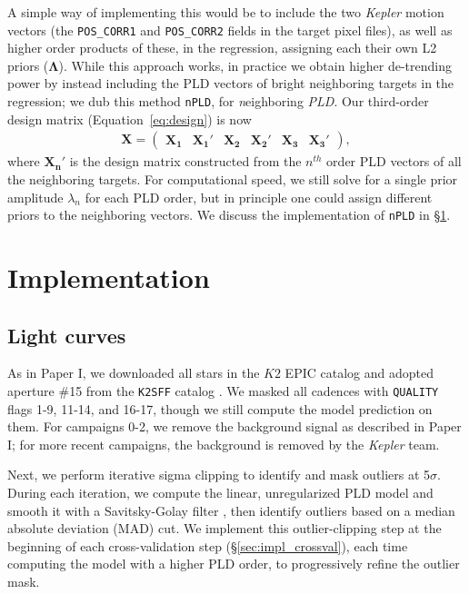 \documentclass[]{emulateapj}
\begin{document}
A simple way of implementing this would be to include the two \emph{Kepler} motion vectors (the
\texttt{POS\_CORR1} and \texttt{POS\_CORR2} fields in the target pixel files), as well as
higher order products of these, in the regression, assigning each their own L2 priors ($\mathbf{\Lambda}$).
While this approach works, in practice we obtain higher de-trending power by instead including the PLD
vectors of bright neighboring targets in the regression; we dub this method \texttt{nPLD}, for \emph{n}eighboring
\emph{PLD}. Our third-order design matrix (Equation~\ref{eq:design}) is now
%
\begin{align}
\label{eq:design_nPLD}
\mathbf{X} = 
\left(
\begin{array}{cccccc}
  \mathbf{X_1} & \mathbf{X_1'} & \mathbf{X_2} & \mathbf{X_2'} & \mathbf{X_3} & \mathbf{X_3'}
\end{array}
\right),
\end{align}
%
where $\mathbf{X_n'}$ is the design matrix constructed from the $n^{th}$ order PLD vectors of all the 
neighboring targets. For computational speed, we still solve for a single prior amplitude $\lambda_n$ 
for each PLD order, but in principle one could assign different priors to the neighboring vectors. We
discuss the implementation of \texttt{nPLD} in \S\ref{sec:implementation}.

\section{Implementation}
\label{sec:implementation}

\subsection{Light curves}
\label{sec:impl_lightcurves}
As in Paper I, we downloaded all stars in the $K2$ EPIC catalog and adopted aperture \#15
from the \texttt{K2SFF} catalog \citep{Vanderburg14,VanderburgJohnson14}. We masked all
cadences with \texttt{QUALITY} flags 1-9, 11-14, and 16-17, though we still compute the
model prediction on them. For campaigns 0-2, we remove the background signal as 
described in Paper I; for more recent campaigns, the background is removed by the \emph{Kepler}
team.

Next, we perform iterative sigma clipping to identify and mask outliers at 5$\sigma$.
During each iteration, we compute the linear, unregularized PLD model and smooth it with
a Savitsky-Golay filter \citep{SavitskyGolay64}, then identify outliers based on a 
median absolute deviation (MAD) cut. We implement this outlier-clipping step at the
beginning of each cross-validation step (\S\ref{sec:impl_crossval}), each time computing
the model with a higher PLD order, to progressively refine the outlier mask.
\end{document}
